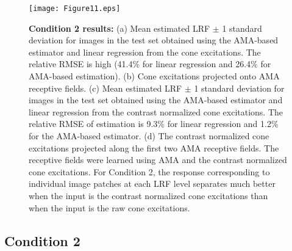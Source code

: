 \documentclass{jov}
\providecommand{\DIFaddbeginFL}{} %
\providecommand{\DIFaddendFL}{} %
\newcommand{\DIFaddincludegraphics}[2][]{{\color{blue}\fbox{\DIFOincludegraphics[#1]{#2}}}} %
\DeclareRobustCommand{\DIFaddbeginFL}{\DIFOaddbeginFL \let\includegraphics\DIFaddincludegraphics} %
\DeclareRobustCommand{\DIFaddendFL}{\DIFOaddendFL \let\includegraphics\DIFOincludegraphics} %
\begin{document}
\begin{figure}
\DIFaddbeginFL \texttt{[image: Figure11.eps]}
    \DIFaddendFL \caption{{\bf Condition 2 results:} (a) Mean estimated LRF $\pm$ 1 standard deviation for images in the test set obtained using the AMA-based estimator and linear regression from the cone excitations. The relative RMSE is high (41.4\% for linear regression and 26.4\% for AMA-based estimation). (b) Cone excitations projected onto AMA receptive fields. (c) Mean estimated LRF $\pm$ 1 standard deviation for images in the test set obtained using the AMA-based estimator and linear regression from the contrast normalized cone excitations. The relative RMSE of estimation is 9.3\% for linear regression and 1.2\% for the AMA-based estimator. (d) The contrast normalized cone excitations projected along the first two AMA receptive fields. The receptive fields were learned using AMA and the contrast normalized cone excitations. For Condition 2, the response corresponding to individual image patches at each LRF level separates much better when the input is the contrast normalized cone excitations than when the input is the raw cone excitations.}
\label{fig:Condition2}
\end{figure}

\subsection{Condition 2}
\end{document}
